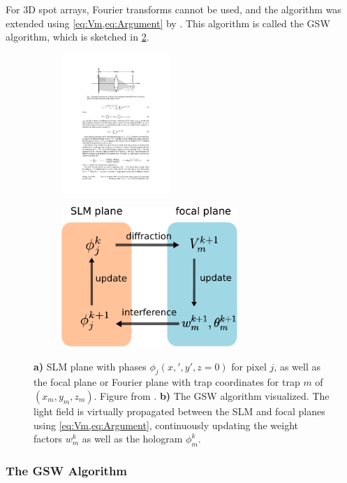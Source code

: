 For 3D spot arrays, Fourier transforms cannot be used, and the algorithm was extended using \cref{eq:Vm,eq:Argument} by \cite{DiLeonardo2007}. 
This algorithm is called the \ac{GSW} algorithm, which is sketched in \cref{fig:GSWalgorithm}.

\begin{figure}
	\centering
	\begin{subfigure}{.56\textwidth}
		\centering
		\includegraphics[height=5.3cm]{figures/SLMgeometry.pdf}
		\caption{}
		\label{fig:SLMgeometry}
	\end{subfigure}
	\begin{subfigure}{.43\textwidth}
		\centering
		\includegraphics[height=5.3cm]{figures/WeightedGerschbergSaxton.pdf}
		\caption{}
		\label{fig:GSWalgorithm}
	\end{subfigure}
	\caption{\textbf{a)} SLM plane with phases $\phi_j(x,',y',z=0)$ for pixel $j$, as well as the focal plane or Fourier plane with trap coordinates for trap $m$ of $(x_m,y_m,z_m)$. 
		Figure from \cite{DiLeonardo2007}. 
		\textbf{b)} The \ac{GSW} algorithm visualized.
		The light field is virtually propagated between the SLM and focal planes using \cref{eq:Vm,eq:Argument}, continuously updating the weight factors $w_m^k$ as well as the hologram $\phi_m^k$.}
	\label{fig:GerschbergSaxton}
\end{figure}

\subsubsection*{The GSW Algorithm}

